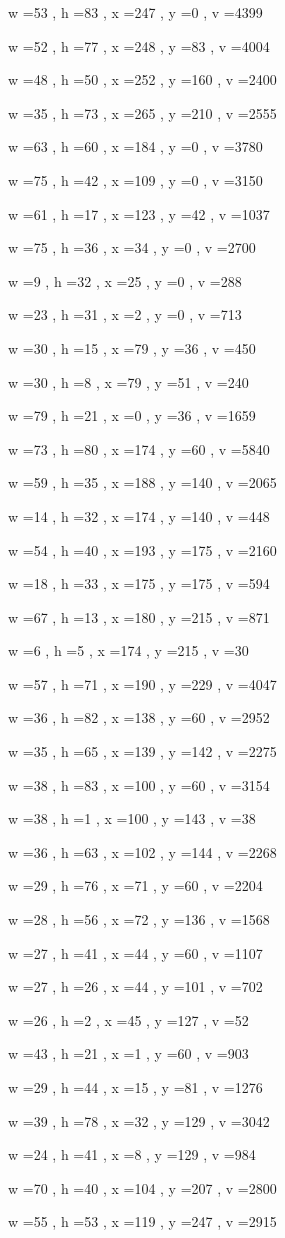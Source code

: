 \documentclass[11pt]{article}
\begin{document}
w =53 , h =83 , x =247 , y =0 , v =4399
\par
w =52 , h =77 , x =248 , y =83 , v =4004
\par
w =48 , h =50 , x =252 , y =160 , v =2400
\par
w =35 , h =73 , x =265 , y =210 , v =2555
\par
w =63 , h =60 , x =184 , y =0 , v =3780
\par
w =75 , h =42 , x =109 , y =0 , v =3150
\par
w =61 , h =17 , x =123 , y =42 , v =1037
\par
w =75 , h =36 , x =34 , y =0 , v =2700
\par
w =9 , h =32 , x =25 , y =0 , v =288
\par
w =23 , h =31 , x =2 , y =0 , v =713
\par
w =30 , h =15 , x =79 , y =36 , v =450
\par
w =30 , h =8 , x =79 , y =51 , v =240
\par
w =79 , h =21 , x =0 , y =36 , v =1659
\par
w =73 , h =80 , x =174 , y =60 , v =5840
\par
w =59 , h =35 , x =188 , y =140 , v =2065
\par
w =14 , h =32 , x =174 , y =140 , v =448
\par
w =54 , h =40 , x =193 , y =175 , v =2160
\par
w =18 , h =33 , x =175 , y =175 , v =594
\par
w =67 , h =13 , x =180 , y =215 , v =871
\par
w =6 , h =5 , x =174 , y =215 , v =30
\par
w =57 , h =71 , x =190 , y =229 , v =4047
\par
w =36 , h =82 , x =138 , y =60 , v =2952
\par
w =35 , h =65 , x =139 , y =142 , v =2275
\par
w =38 , h =83 , x =100 , y =60 , v =3154
\par
w =38 , h =1 , x =100 , y =143 , v =38
\par
w =36 , h =63 , x =102 , y =144 , v =2268
\par
w =29 , h =76 , x =71 , y =60 , v =2204
\par
w =28 , h =56 , x =72 , y =136 , v =1568
\par
w =27 , h =41 , x =44 , y =60 , v =1107
\par
w =27 , h =26 , x =44 , y =101 , v =702
\par
w =26 , h =2 , x =45 , y =127 , v =52
\par
w =43 , h =21 , x =1 , y =60 , v =903
\par
w =29 , h =44 , x =15 , y =81 , v =1276
\par
w =39 , h =78 , x =32 , y =129 , v =3042
\par
w =24 , h =41 , x =8 , y =129 , v =984
\par
w =70 , h =40 , x =104 , y =207 , v =2800
\par
w =55 , h =53 , x =119 , y =247 , v =2915
\par
\newpage
\end{document}
